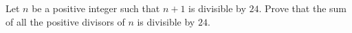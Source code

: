 Let $n$ be a positive integer such that $n+1$ is divisible by $24$. Prove that the sum of all the positive divisors of $n$ is divisible by $24$.
